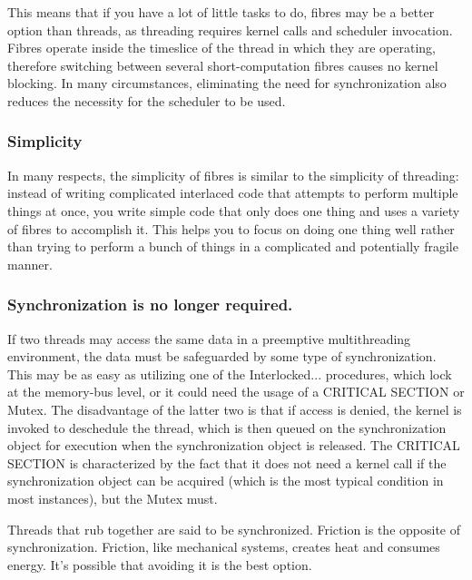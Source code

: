 This means that if you have a lot of little tasks to do, fibres may be a better option than threads, as threading requires kernel calls and scheduler invocation. Fibres operate inside the timeslice of the thread in which they are operating, therefore switching between several short-computation fibres causes no kernel blocking. In many circumstances, eliminating the need for synchronization also reduces the necessity for the scheduler to be used.

\subsubsection{Simplicity}
In many respects, the simplicity of fibres is similar to the simplicity of threading: instead of writing complicated interlaced code that attempts to perform multiple things at once, you write simple code that only does one thing and uses a variety of fibres to accomplish it. This helps you to focus on doing one thing well rather than trying to perform a bunch of things in a complicated and potentially fragile manner.

\subsubsection{Synchronization is no longer required.}
If two threads may access the same data in a preemptive multithreading environment, the data must be safeguarded by some type of synchronization. This may be as easy as utilizing one of the Interlocked... procedures, which lock at the memory-bus level, or it could need the usage of a CRITICAL SECTION or Mutex. The disadvantage of the latter two is that if access is denied, the kernel is invoked to deschedule the thread, which is then queued on the synchronization object for execution when the synchronization object is released. The CRITICAL SECTION is characterized by the fact that it does not need a kernel call if the synchronization object can be acquired (which is the most typical condition in most instances), but the Mutex must.

Threads that rub together are said to be synchronized. Friction is the opposite of synchronization. Friction, like mechanical systems, creates heat and consumes energy. It's possible that avoiding it is the best option.

